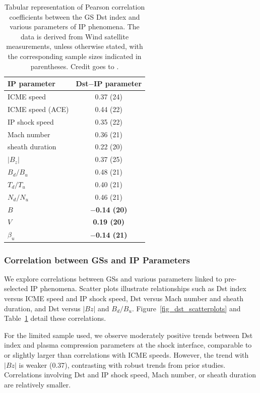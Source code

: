 \begin{table}[!htp] 
	\small
	\centering
	\caption{Tabular representation of Pearson correlation coefficients between the GS Dst index and various parameters of IP phenomena. The data is derived from Wind satellite measurements, unless otherwise stated, with the corresponding sample sizes indicated in parentheses. Credit goes to \citet{miteva_2023}.}
	\label{tab_cc_IP}
	\begin{tabular}{lc}
		\toprule
		\textbf{IP parameter} & \textbf{Dst$-$IP parameter} \\
		\midrule
		ICME speed  & 0.37 (24)	\\
		ICME speed (ACE)   & 0.44 (22)	\\
		IP shock speed  & 0.35 (22)	\\
		Mach number  & 0.36 (21)	\\ 
		sheath duration & 0.22 (20) \\
		$|B_z|$      & 0.37 (25) \\
		$B_d/B_u$  & 0.48 (21)	\\
		$T_d/T_u$  & 0.40 (21)	\\
		$N_d/N_u$  & 0.46 (21)	\\
		{\bf $B$}  & {\bf $-$0.14 (20)}  \\
		{\bf $V$}       & {\bf 0.19 (20)}	\\
		{\bf $\beta_u$} & {\bf $-$0.14 (21)}	\\
		\bottomrule
	\end{tabular}
\end{table}

\subsubsection{Correlation between GSs and IP Parameters}
We explore correlations between GSs and various parameters linked to pre-selected IP phenomena. Scatter plots illustrate relationships such as Dst index versus ICME speed and IP shock speed, Dst versus Mach number and sheath duration, and Dst versus $|Bz|$ and $B_d/B_u$. Figure~\ref{fig_dst_scatterplots} and Table~\ref{tab_cc_IP} detail these correlations.

For the limited sample used, we observe moderately positive trends between Dst index and plasma compression parameters at the shock interface, comparable to or slightly larger than correlations with ICME speeds. However, the trend with $|Bz|$ is weaker (0.37), contrasting with robust trends from prior studies. Correlations involving Dst and IP shock speed, Mach number, or sheath duration are relatively smaller.

